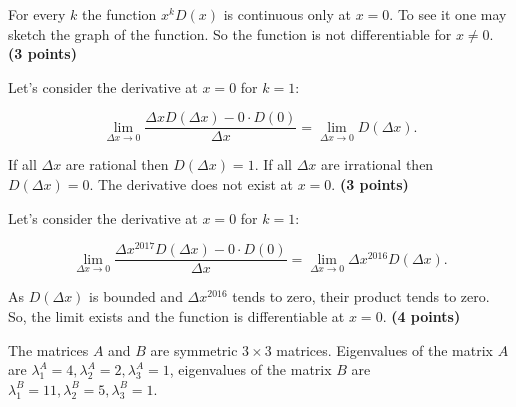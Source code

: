 \documentclass[addpoints, answers]{exam} %
\DeclareMathOperator{\tr}{tr}
\begin{document}
\begin{questions}
\begin{solution}
For every $k$ the function $x^k D(x)$ is continuous only at $x=0$. To see it one may sketch the graph of the function. So the function is not differentiable for $x\neq 0$. \textbf{(3 points)}

Let's consider the derivative at $x=0$ for $k=1$:

\[
\lim_{\Delta x \to 0} \frac{\Delta x D(\Delta x) - 0 \cdot D(0)}{\Delta x} = \lim_{\Delta x \to 0} D(\Delta x).
\]

If all $\Delta x$ are rational then $D(\Delta x)=1$.  If all $\Delta x$ are irrational then $D(\Delta x)=0$. The derivative does not exist at $x=0$. \textbf{(3 points)}

Let's consider the derivative at $x=0$ for $k=1$:

\[
\lim_{\Delta x \to 0} \frac{\Delta x^{2017} D(\Delta x) - 0 \cdot D(0)}{\Delta x} = \lim_{\Delta x \to 0} \Delta x^{2016} D(\Delta x).
\]

As  $D(\Delta x)$ is bounded and $\Delta x^{2016}$ tends to zero, their product tends to zero. So, the limit exists and the function is differentiable at $x=0$. \textbf{(4 points)}

\end{solution}


\question The matrices $A$ and $B$ are symmetric $3 \times 3$ matrices. Eigenvalues of the matrix $A$ are $\lambda^A_1 = 4, \lambda^A_2 = 2, \lambda^A_3 = 1$, eigenvalues of the matrix $B$ are $\lambda^B_1 = 11, \lambda^B_2 = 5, \lambda^B_3 = 1$.

\end{questions}
\end{document}
